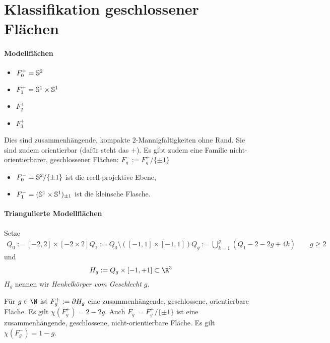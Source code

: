\section{Klassifikation geschlossener Flächen}

\paragraph{Modellflächen}

\begin{ex}
	\begin{itemize}
		\item
			$F_0^+ = \S^2$
		\item
			$F_1^+ = \S^1 \times \S^1$
		\item
			$F_2^+$
		\item
			$F_3^+$
	\end{itemize}
	Dies sind zusammenhängende, kompakte $2$-Mannigfaltigkeiten ohne Rand.
	Sie sind zudem orientierbar (dafür steht das $+$).
	Es gibt zudem eine Familie nicht-orientierbarer, geschlossener Flächen: $F_g^- := F_g^+ / \{\pm 1\}$
	\begin{itemize}
		\item
			$F_0^- = \S^2 / \{\pm 1\}$ ist die reell-projektive Ebene,
		\item
			$F_1^- = (\S^1 \times \S^1)_{\pm 1}$ ist die kleinsche Flasche.
	\end{itemize}
\end{ex}



\paragraph{Triangulierte Modellflächen}

Setze
\begin{align*}
	Q_0 := [-2, 2] \times [-2 \times 2]
	Q_1 := Q_0 \setminus ([-1,1] \times [-1,1])
	Q_g := \bigcup_{k=1}^g (Q_1 - 2 - 2g + 4k) \qquad g \ge 2
\end{align*}
und
\[
	H_g := Q_g \times [-1,+1] \subset \R^3
\]
$H_g$ nennen wir \emph{Henkelkörper vom Geschlecht $g$}.

\begin{st}
	Für $g \in \N$ ist $F_g^+ := \boundary H_g$ eine zusammenhängende, geschlossene, orientierbare Fläche.
	Es gilt $\chi(F_g^+) = 2 - 2g$.
	Auch $F_g^- = F_g^+ / \{\pm 1\}$ ist eine zusammenhängende, geschlossene, nicht-orientierbare Fläche.
	Es gilt $\chi(F_g^-) = 1 - g$.
\end{st}

